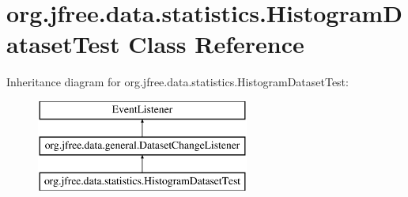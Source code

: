 \hypertarget{classorg_1_1jfree_1_1data_1_1statistics_1_1_histogram_dataset_test}{}\section{org.\+jfree.\+data.\+statistics.\+Histogram\+Dataset\+Test Class Reference}
\label{classorg_1_1jfree_1_1data_1_1statistics_1_1_histogram_dataset_test}
Inheritance diagram for org.\+jfree.\+data.\+statistics.\+Histogram\+Dataset\+Test\+:\begin{figure}[H]
\begin{center}
\leavevmode
\includegraphics[height=3.000000cm]{classorg_1_1jfree_1_1data_1_1statistics_1_1_histogram_dataset_test}
\end{center}
\end{figure}

